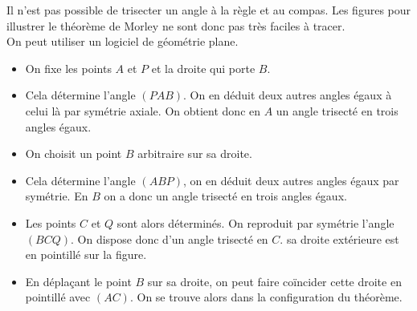 Il n'est pas possible de trisecter un angle à la règle et au compas. Les figures pour illustrer le théorème de Morley ne sont donc pas très faciles à tracer.\\
On peut utiliser un logiciel de géométrie plane.
\begin{itemize}
 \item On fixe les points $A$ et $P$ et la droite qui porte $B$.
\item Cela détermine l'angle $(PAB)$. On en déduit deux autres angles égaux à celui là par symétrie axiale. On obtient donc en $A$ un angle trisecté en trois angles égaux.
\item On choisit un point $B$ arbitraire sur sa droite.
\item Cela détermine l'angle $(ABP)$, on en déduit deux autres angles égaux par symétrie. En $B$ on a donc un angle trisecté en trois angles égaux.
\item Les points $C$ et $Q$ sont alors déterminés. On reproduit par symétrie l'angle $(BCQ)$. On dispose donc d'un angle trisecté en $C$. sa droite extérieure est en pointillé sur la figure.
\item En déplaçant le point $B$ sur sa droite, on peut faire coïncider cette droite en pointillé avec $(AC)$. On se trouve alors dans la configuration du théorème.
\end{itemize}
 